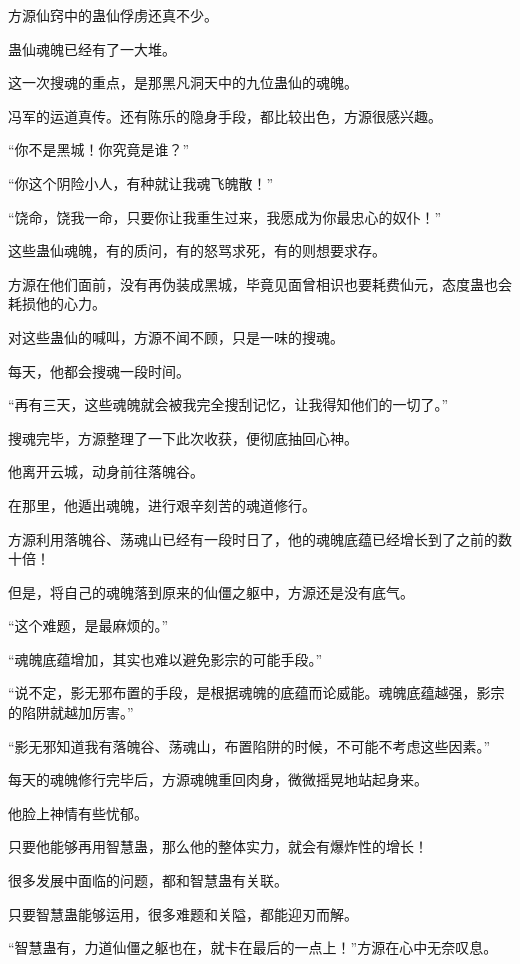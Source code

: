 \begin{this_body}
方源仙窍中的蛊仙俘虏还真不少。

蛊仙魂魄已经有了一大堆。

这一次搜魂的重点，是那黑凡洞天中的九位蛊仙的魂魄。

冯军的运道真传。还有陈乐的隐身手段，都比较出色，方源很感兴趣。

“你不是黑城！你究竟是谁？”

“你这个阴险小人，有种就让我魂飞魄散！”

“饶命，饶我一命，只要你让我重生过来，我愿成为你最忠心的奴仆！”

这些蛊仙魂魄，有的质问，有的怒骂求死，有的则想要求存。

方源在他们面前，没有再伪装成黑城，毕竟见面曾相识也要耗费仙元，态度蛊也会耗损他的心力。

对这些蛊仙的喊叫，方源不闻不顾，只是一味的搜魂。

每天，他都会搜魂一段时间。

“再有三天，这些魂魄就会被我完全搜刮记忆，让我得知他们的一切了。”

搜魂完毕，方源整理了一下此次收获，便彻底抽回心神。

他离开云城，动身前往落魄谷。

在那里，他遁出魂魄，进行艰辛刻苦的魂道修行。

方源利用落魄谷、荡魂山已经有一段时日了，他的魂魄底蕴已经增长到了之前的数十倍！

但是，将自己的魂魄落到原来的仙僵之躯中，方源还是没有底气。

“这个难题，是最麻烦的。”

“魂魄底蕴增加，其实也难以避免影宗的可能手段。”

“说不定，影无邪布置的手段，是根据魂魄的底蕴而论威能。魂魄底蕴越强，影宗的陷阱就越加厉害。”

“影无邪知道我有落魄谷、荡魂山，布置陷阱的时候，不可能不考虑这些因素。”

每天的魂魄修行完毕后，方源魂魄重回肉身，微微摇晃地站起身来。

他脸上神情有些忧郁。

只要他能够再用智慧蛊，那么他的整体实力，就会有爆炸性的增长！

很多发展中面临的问题，都和智慧蛊有关联。

只要智慧蛊能够运用，很多难题和关隘，都能迎刃而解。

“智慧蛊有，力道仙僵之躯也在，就卡在最后的一点上！”方源在心中无奈叹息。


\end{this_body}
